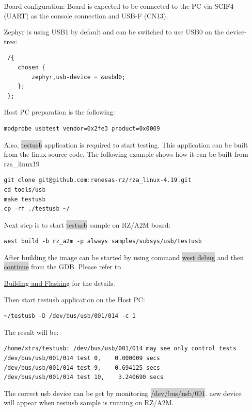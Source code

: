 \documentclass[11pt,a4paper,oneside]{article}
\begin{document}
Board configuration: Board is expected to be connected to the PC via SCIF4 (UART) as the console
connection and USB-F (CN13).

Zephyr is using USB1 by default and can be switched to use USB0 on the device-tree:
\begin{lstlisting}
 /{
	chosen {
		zephyr,usb-device = &usbd0;
	};
 };
\end{lstlisting}

Host PC preparation is the following:
\begin{lstlisting}
modprobe usbtest vendor=0x2fe3 product=0x0009
\end{lstlisting}

Also, \colorbox{lightgray}{testusb} application is required to start testing.
This application can be built from the linux source code.
The following example shows how it can be built from rza\_linux\.19

\begin{lstlisting}
git clone git@github.com:renesas-rz/rza_linux-4.19.git
cd tools/usb
make testusb
cp -rf ./testusb ~/
\end{lstlisting}

Next step is to start \colorbox{lightgray}{testusb} sample on RZ/A2M board:
\begin{lstlisting}
west build -b rz_a2m -p always samples/subsys/usb/testusb
\end{lstlisting}

After building the image can be started by using command \colorbox{lightgray}{west debug}
and then \colorbox{lightgray}{continue} from the GDB. Please refer to

\hyperref[building-and-flashing]{Building and Flashing} for the
details.

Then start testusb application on the Host PC:
\begin{lstlisting}
~/testusb -D /dev/bus/usb/001/014 -c 1
\end{lstlisting}

The result will be:

\begin{lstlisting}
/home/xtrs/testusb: /dev/bus/usb/001/014 may see only control tests
/dev/bus/usb/001/014 test 0,    0.000009 secs
/dev/bus/usb/001/014 test 9,    0.694125 secs
/dev/bus/usb/001/014 test 10,    3.240690 secs
\end{lstlisting}

The correct usb device can be get by monitoring \colorbox{lightgray}{/dev/bus/usb/001}.
new device will appear when testusb sample is running on RZ/A2M.
\end{document}
